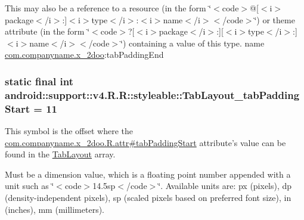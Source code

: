 This may also be a reference to a resource (in the form \char`\"{}$<$code$>$@\mbox{[}$<$i$>$package$<$/i$>$:\mbox{]}$<$i$>$type$<$/i$>$:$<$i$>$name$<$/i$>$$<$/code$>$\char`\"{}) or theme attribute (in the form \char`\"{}$<$code$>$?\mbox{[}$<$i$>$package$<$/i$>$:\mbox{]}\mbox{[}$<$i$>$type$<$/i$>$:\mbox{]}$<$i$>$name$<$/i$>$$<$/code$>$\char`\"{}) containing a value of this type.  name \hyperlink{namespacecom_1_1companyname_1_1x__2doo}{com.companyname.x\_\-2doo}:tabPaddingEnd \hypertarget{classandroid_1_1support_1_1v4_1_1_r_1_1styleable_1a5292e1b40f0fa300a0dbb3286373d6}{
\subsubsection[{TabLayout\_\-tabPaddingStart}]{\setlength{\rightskip}{0pt plus 5cm}static final int android::support::v4.R.R::styleable::TabLayout\_\-tabPaddingStart = 11}}
\label{classandroid_1_1support_1_1v4_1_1_r_1_1styleable_1a5292e1b40f0fa300a0dbb3286373d6}


This symbol is the offset where the \hyperlink{classcom_1_1companyname_1_1x__2doo_1_1_r_1_1attr_3bfcf0810624473088f98ee2b0fd0fd5}{com.companyname.x\_\-2doo.R.attr\#tabPaddingStart} attribute's value can be found in the \hyperlink{classandroid_1_1support_1_1v4_1_1_r_1_1styleable_d1f1104cdc4fac0ab4797d48f7efe351}{TabLayout} array.

Must be a dimension value, which is a floating point number appended with a unit such as \char`\"{}$<$code$>$14.5sp$<$/code$>$\char`\"{}. Available units are: px (pixels), dp (density-independent pixels), sp (scaled pixels based on preferred font size), in (inches), mm (millimeters). 

